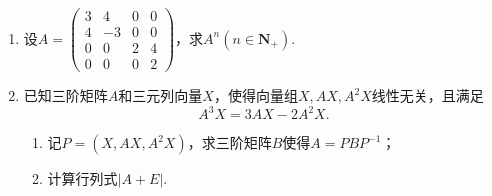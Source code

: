 \begin{enumerate}
    \item 设$A=\begin{pmatrix}
                  3 & 4 & 0 & 0 \\ 4 & -3 & 0 & 0 \\ 0 & 0 & 2 & 4 \\ 0 & 0 & 0 & 2
              \end{pmatrix}$，求$A^n(n\in\mathbf{N}_+)$.

    \item 已知三阶矩阵$A$和三元列向量$X$，使得向量组$X,AX,A^2X$线性无关，且满足
          \[A^3X=3AX-2A^2X.\]
          \begin{enumerate}
              \item 记$P=(X,AX,A^2X)$，求三阶矩阵$B$使得$A=PBP^{-1}$；

              \item 计算行列式$|A+E|$.
          \end{enumerate}
\end{enumerate}

